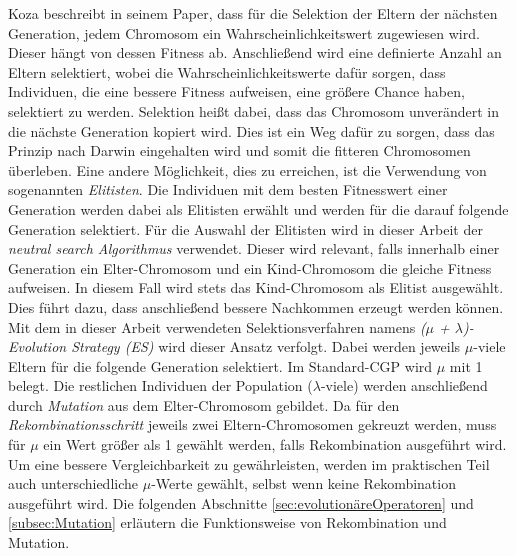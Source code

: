 Koza beschreibt in seinem Paper, dass für die Selektion der Eltern der nächsten Generation, jedem Chromosom ein Wahrscheinlichkeitswert zugewiesen wird.
Dieser hängt von dessen Fitness ab.
Anschließend wird eine definierte Anzahl an Eltern selektiert, wobei die Wahrscheinlichkeitswerte dafür sorgen, dass Individuen, die eine bessere Fitness aufweisen, eine größere Chance haben, selektiert zu werden.
Selektion heißt dabei, dass das Chromosom unverändert in die nächste Generation kopiert wird. \cite{koza_survey_1995}\newline
Dies ist ein Weg dafür zu sorgen, dass das Prinzip nach Darwin eingehalten wird und somit die fitteren Chromosomen \glqq überleben\grqq. 
Eine andere Möglichkeit, dies zu erreichen, ist die Verwendung von sogenannten \emph{Elitisten}.
Die Individuen mit dem besten Fitnesswert einer Generation werden dabei als Elitisten erwählt und werden für die darauf folgende Generation selektiert. \cite{krawiec_genetic_2013}
Für die Auswahl der Elitisten wird in dieser Arbeit der \emph{neutral search Algorithmus} verwendet.
Dieser wird relevant, falls innerhalb einer Generation ein Elter-Chromosom und ein Kind-Chromosom die gleiche Fitness aufweisen.
In diesem Fall wird stets das Kind-Chromosom als Elitist ausgewählt.
Dies führt dazu, dass anschließend bessere Nachkommen erzeugt werden können. \cite{mernik_refining_2022}\newline
Mit dem in dieser Arbeit verwendeten Selektionsverfahren namens \emph{($\mu$ + $\lambda$)-Evolution Strategy (ES)} wird dieser Ansatz verfolgt. 
Dabei werden jeweils $\mu$-viele Eltern für die folgende Generation selektiert.
Im Standard-CGP wird $\mu$ mit 1 belegt.
Die restlichen Individuen der Population ($\lambda$-viele) werden anschließend durch \emph{Mutation} aus dem Elter-Chromosom gebildet. \cite{da_silva_cartesian_2018}
Da für den \emph{Rekombinationsschritt} jeweils zwei Eltern-Chromosomen gekreuzt werden, muss für $\mu$ ein Wert größer als 1 gewählt werden, falls Rekombination ausgeführt wird.
Um eine bessere Vergleichbarkeit zu gewährleisten, werden im praktischen Teil auch unterschiedliche $\mu$-Werte gewählt, selbst wenn keine Rekombination ausgeführt wird.\newline
Die folgenden Abschnitte \ref{sec:evolutionäreOperatoren} und \ref{subsec:Mutation} erläutern die Funktionsweise von Rekombination und Mutation.


